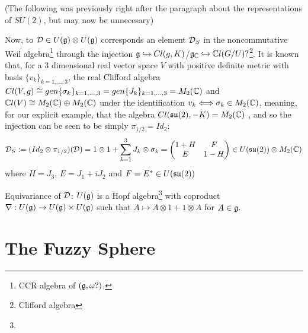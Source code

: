 {\color{gray} (The following was previously right after the paragraph about the representations of $SU(2)$, but may now be unnecesary)

Now, to $\mathcal D \in U(\mathfrak{g}) \otimes U(\mathfrak{g})$ corresponds an element $\mathcal D_S$ in the noncommutative Weil algebra\footnote{CCR algebra of $(\mathfrak{g}, \omega?)$. } through the injection $\mathfrak{g} \hookrightarrow Cl(g, K)$/$\mathfrak{g}_{\mathbb{C}} \hookrightarrow \mathbb{C} l(G/U)?$\footnote{Clifford algebra}. It is known that, for a $3$ dimensional real vector space $V$ with positive definite metric with basis $\{v_k\}_{k = 1, \dots, 3}$, the real Clifford algebra $Cl(V, g) \cong gen\{\sigma_k\}_{k = 1, \dots, 3} = gen\{J_k\}_{k = 1, \dots, 3} = M_2(\mathbb{C})$ and $\mathbb{C} l(V) \cong M_2(\mathbb{C}) \oplus M_2(\mathbb{C})$ under the identification $v_k \Longleftrightarrow \sigma_k \in M_2(\mathbb{C})$, meaning, for our explicit example, that the algebra $Cl(\mathfrak{su}(2), -K) = M_2(\mathbb{C})$ 
, and so the injection can be seen to be simply $\pi_{1/2} = Id_2$:
\begin{equation}
    \mathcal D_S := (Id_2 \otimes \pi_{1/2})(\mathcal D) = 1 \otimes 1 + \sum_{k = 1}^3 J_k \otimes \sigma_k = \begin{pmatrix} 1 + H & F \\ E & 1 - H \end{pmatrix} \in U(\mathfrak{su}(2))\otimes M_2(\mathbb{C})
\end{equation}
where $H = J_3$, $E = J_1 + iJ_2$ and $F = E^* \in U(\mathfrak{su}(2))$


Equivariance of $\mathcal D$: $U(\mathfrak{g})$ is a Hopf algebra\footnote{} with coproduct $\nabla: U(\mathfrak{g}) \to U(\mathfrak{g}) \times U(\mathfrak{g})$ such that $A \mapsto A \otimes 1 + 1 \otimes A$ for $A \in \mathfrak{g}$.}

\lin 



\section{The Fuzzy Sphere}

